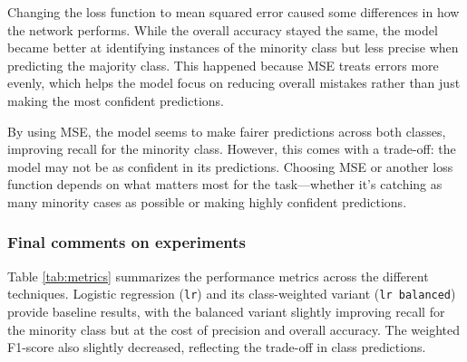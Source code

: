 	
	Changing the loss function to mean squared error caused some differences in how the network performs. While the overall accuracy stayed the same, the model became better at identifying instances of the minority class but less precise when predicting the majority class. This happened because MSE treats errors more evenly, which helps the model focus on reducing overall mistakes rather than just making the most confident predictions.
	
	By using MSE, the model seems to make fairer predictions across both classes, improving recall for the minority class. However, this comes with a trade-off: the model may not be as confident in its predictions. Choosing MSE or another loss function depends on what matters most for the task—whether it's catching as many minority cases as possible or making highly confident predictions.
	
	\subsubsection{Final comments on experiments}
	

	
	Table \ref{tab:metrics} summarizes the performance metrics across the different techniques. Logistic regression (\texttt{lr}) and its class-weighted variant (\texttt{lr balanced}) provide baseline results, with the balanced variant slightly improving recall for the minority class but at the cost of precision and overall accuracy. The weighted F1-score also slightly decreased, reflecting the trade-off in class predictions.
	
